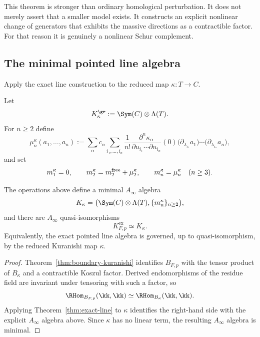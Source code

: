 \begin{remark}
This theorem is stronger than ordinary homological perturbation. It does not merely assert that a smaller model exists. It constructs an explicit nonlinear change of generators that exhibits the massive directions as a contractible factor. For that reason it is genuinely a nonlinear Schur complement.
\end{remark}

\subsection{The minimal pointed line algebra}

Apply the exact line construction to the reduced map $\kappa:T\to C$.

Let
\[
K_\kappa^{\gr}:=\Sym(C)\ot \Lambda(T).
\]
For $n\ge 2$ define
\begin{equation}\label{eq:mu-kappa}
\mu_n^\kappa(a_1,\dots,a_n)
:=
\sum_{\alpha}
c_\alpha
\sum_{i_1,\dots,i_n}
\frac{1}{n!}
\frac{\partial^n\kappa_\alpha}{\partial u_{i_1}\cdots \partial u_{i_n}}(0)
\bigl(\partial_{\lambda_{i_1}}a_1\bigr)\cdots \bigl(\partial_{\lambda_{i_n}}a_n\bigr),
\end{equation}
and set
\[
m_1^\kappa=0,
\qquad
m_2^\kappa=m_2^{\mathrm{free}}+\mu_2^\kappa,
\qquad
m_n^\kappa=\mu_n^\kappa\quad (n\ge 3).
\]

\begin{theorem}\label{thm:minimal-pointed-line}
The operations above define a minimal $A_\infty$ algebra
\[
K_\kappa
=
\bigl(\Sym(C)\ot \Lambda(T),\{m_n^\kappa\}_{n\ge 2}\bigr),
\]
and there are $A_\infty$ quasi-isomorphisms
\[
K_{F,p}^{\mathrm{ex}}
\simeq
K_\kappa.
\]
Equivalently, the exact pointed line algebra is governed, up to quasi-isomorphism, by the reduced Kuranishi map $\kappa$.
\end{theorem}

\begin{proof}
Theorem~\ref{thm:boundary-kuranishi} identifies $B_{F,p}$ with the tensor product of $B_\kappa$ and a contractible Koszul factor. Derived endomorphisms of the residue field are invariant under tensoring with such a factor, so
\[
\RHom_{B_{F,p}}(\kk,\kk)\simeq \RHom_{B_\kappa}(\kk,\kk).
\]
Applying Theorem~\ref{thm:exact-line} to $\kappa$ identifies the right-hand side with the explicit $A_\infty$ algebra above. Since $\kappa$ has no linear term, the resulting $A_\infty$ algebra is minimal.
\end{proof}

